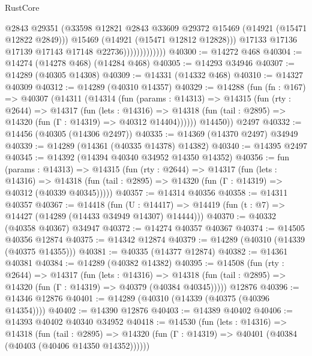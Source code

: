 \begin{lexlean}{RustCore}
\begin{coremodule}
                                @2843
                                @29351
                                (@33598
                                  @12821
                                  @2843
                                  @33609
                                  @29372
                                  @15469
                                  (@14921 (@15471 @12822 @2849)))
                                @15469
                                (@14921 (@15471 @12812 @12828)))
                              @17133
                              @17136
                              @17139
                              @17143
                              @17148
                              @22736)))))))))))))
@40300 := @14272 @468
@40304 := @14274 (@14278 @468) (@14284 @468)
@40305 := @14293 @34946
@40307 := @14289 (@40305 @14308)
@40309 := @14331 (@14332 @468)
@40310 := @14327 @40309
@40312 := @14289 (@40310 @14357)
@40329 := @14288
    (fun (fn : @167) =>
    @40307
      (@14311
        (@14314
          (fun (params : @14313) =>
          @14315
            (fun (rty : @2644) =>
            @14317
              (fun (lets : @14316) =>
              @14318 (fun (tail : @2895) => @14320 (fun (Γ : @14319) => @40312 @14404))))))
        @14450))
    @2497
@40332 := @14456 (@40305 (@14306 @2497))
@40335 := @14369 (@14370 @2497) @34949
@40339 := @14289 (@14361 (@40335 @14378) @14382)
@40340 := @14395 @2497
@40345 := @14392 (@14394 @40340 @34952 @14350 @14352)
@40356 := fun (params : @14313) =>
  @14315
    (fun (rty : @2644) =>
    @14317
      (fun (lets : @14316) =>
      @14318 (fun (tail : @2895) => @14320 (fun (Γ : @14319) => @40312 (@40339 @40345)))))
@40357 := @14314 @40356
@40358 := @14311 @40357
@40367 := @14418
    (fun (U : @14417) => @14419 (fun (t : @7) => @14427 (@14289 (@14433 @34949 @14307) @14444)))
@40370 := @40332 (@40358 @40367) @34947
@40372 := @14274 @40357 @40367
@40374 := @14505 @40356 @12874
@40375 := @14342 @12874
@40379 := @14289 (@40310 (@14339 (@40375 @14355)))
@40381 := @40335 (@14377 @12874)
@40382 := @14361 @40381
@40384 := @14289 (@40382 @14382)
@40395 := @14508
    (fun (rty : @2644) =>
    @14317
      (fun (lets : @14316) =>
      @14318 (fun (tail : @2895) => @14320 (fun (Γ : @14319) => @40379 (@40384 @40345)))))
    @12876
@40396 := @14346 @12876
@40401 := @14289 (@40310 (@14339 (@40375 (@40396 @14354))))
@40402 := @14390 @12876
@40403 := @14389 @40402
@40406 := @14393 @40402 @40340 @34952
@40418 := @14530
    (fun (lets : @14316) =>
    @14318
      (fun (tail : @2895) =>
      @14320 (fun (Γ : @14319) => @40401 (@40384 (@40403 (@40406 @14350 @14352))))))

\end{coremodule}
\end{lexlean}
